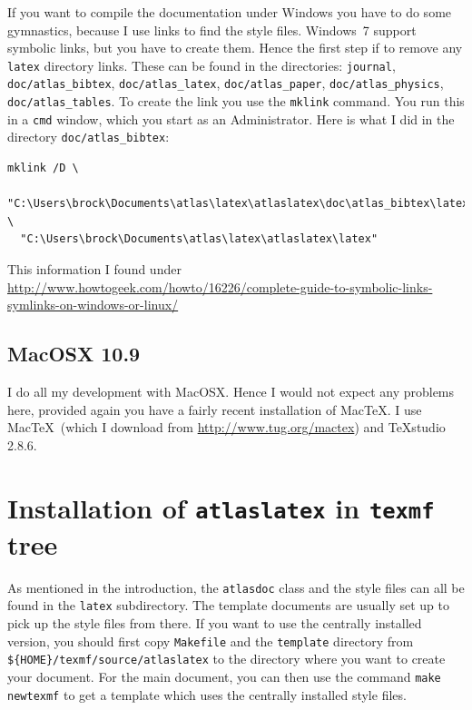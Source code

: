 \documentclass[UKenglish]{latex/atlasdoc}
\newcommand{\File}[1]{\texttt{#1}\xspace}
\newcommand{\Package}[1]{\texttt{#1}\xspace}
\begin{document}
If you want to compile the documentation under Windows you have to do some gymnastics,
because I use links to find the style files.
Windows~7 support symbolic links, but you have to create them.
Hence the first step if to remove any \texttt{latex} directory links.
These can be found in the directories: 
\File{journal}, \File{doc/atlas\_bibtex}, \File{doc/atlas\_latex}, \File{doc/atlas\_paper}, 
\File{doc/atlas\_physics}, \File{doc/atlas\_tables}.
To create the link you use the \Package{mklink} command.
You run this in a \Package{cmd} window, which you start as an Administrator.
Here is what I did in the directory \File{doc/atlas\_bibtex}:
\begin{verbatim}
mklink /D \
  "C:\Users\brock\Documents\atlas\latex\atlaslatex\doc\atlas_bibtex\latex" \
  "C:\Users\brock\Documents\atlas\latex\atlaslatex\latex"
\end{verbatim}
This information I found under\\
{\footnotesize \url{http://www.howtogeek.com/howto/16226/complete-guide-to-symbolic-links-symlinks-on-windows-or-linux/}}


\subsection{MacOSX 10.9}

I do all my development with MacOSX.
Hence I would not expect any problems here, provided again you have a fairly recent
installation of Mac\TeX.
I use	Mac\TeX\ (which I download from \url{http://www.tug.org/mactex}) and TeXstudio 2.8.6.


\section{Installation of \Package{atlaslatex} in \File{texmf} tree}
\label{sec:texmf}

As mentioned in the introduction, the \texttt{atlasdoc} class and the style files can all be found in the 
\File{latex} subdirectory. The template documents are usually set up to pick up the style files from there.
If you want to use the centrally installed version,
you should first copy \File{Makefile} and the \File{template} directory from 
\File{\$\{HOME\}/texmf/source/atlaslatex} to the directory where you want to create your document.
For the main document, you can then use the command \texttt{make newtexmf} to get a template which uses the
centrally installed style files.
\end{document}
